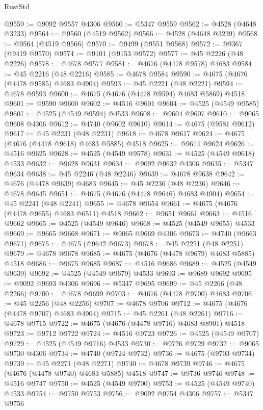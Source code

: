 \begin{lexlean}{RustStd}
\begin{coremodule}
{\begin{coremodule}
{{{{{{{{{{{{{{{{{{{{{{{{{{{{{{{{{{{{{{{{{{{{{{{{{{{{{{{{{{{{@9559 := @9092 @9557 @4306
@9560 := @5347 @9559
@9562 := @4528 (@4648 @3233)
@9564 := @9560 (@4519 @9562)
@9566 := @4528 (@4648 @3239)
@9568 := @9564 (@4519 @9566)
@9570 := @9499 (@9551 @9568)
@9572 := @9367 (@9419 @9570)
@9574 := @9101 (@9153 @9572)
@9577 := @45 @2226 (@48 @2226)
@9578 := @4678 @9577
@9581 := @4676 (@4478 @9578) @4683
@9584 := @45 @2216 (@48 @2216)
@9585 := @4678 @9584
@9590 := @4675 (@4676 (@4478 @9585) @4683 @4904)
@9593 := @45 @2221 (@48 @2221)
@9594 := @4678 @9593
@9600 := @4675 (@4676 (@4478 @9594) @4683 @5869) @4518
@9601 := @9590 @9600
@9602 := @4516 @9601
@9604 := @4525 (@4549 @9585)
@9607 := @4525 (@4549 @9594) @4533
@9608 := @9604 @9607
@9610 := @9065 @9608 @4306
@9612 := @4740 (@9602 @9610)
@9614 := @4675 (@9581 @9612)
@9617 := @45 @2231 (@48 @2231)
@9618 := @4678 @9617
@9624 := @4675 (@4676 (@4478 @9618) @4683 @5885) @4518
@9625 := @9614 @9624
@9626 := @4516 @9625
@9628 := @4525 (@4549 @9578)
@9631 := @4525 (@4549 @9618) @4533
@9632 := @9628 @9631
@9634 := @9092 @9632 @4306
@9635 := @5347 @9634
@9638 := @45 @2246 (@48 @2246)
@9639 := @4678 @9638
@9642 := @4676 (@4478 @9639) @4683
@9645 := @45 @2236 (@48 @2236)
@9646 := @4678 @9645
@9651 := @4675 (@4676 (@4478 @9646) @4683 @4904)
@9654 := @45 @2241 (@48 @2241)
@9655 := @4678 @9654
@9661 := @4675 (@4676 (@4478 @9655) @4683 @6511) @4518
@9662 := @9651 @9661
@9663 := @4516 @9662
@9665 := @4525 (@4549 @9646)
@9668 := @4525 (@4549 @9655) @4533
@9669 := @9665 @9668
@9671 := @9065 @9669 @4306
@9673 := @4740 (@9663 @9671)
@9675 := @4675 (@9642 @9673)
@9678 := @45 @2251 (@48 @2251)
@9679 := @4678 @9678
@9685 := @4675 (@4676 (@4478 @9679) @4683 @5885) @4518
@9686 := @9675 @9685
@9687 := @4516 @9686
@9689 := @4525 (@4549 @9639)
@9692 := @4525 (@4549 @9679) @4533
@9693 := @9689 @9692
@9695 := @9092 @9693 @4306
@9696 := @5347 @9695
@9699 := @45 @2266 (@48 @2266)
@9700 := @4678 @9699
@9703 := @4676 (@4478 @9700) @4683
@9706 := @45 @2256 (@48 @2256)
@9707 := @4678 @9706
@9712 := @4675 (@4676 (@4478 @9707) @4683 @4904)
@9715 := @45 @2261 (@48 @2261)
@9716 := @4678 @9715
@9722 := @4675 (@4676 (@4478 @9716) @4683 @8901) @4518
@9723 := @9712 @9722
@9724 := @4516 @9723
@9726 := @4525 (@4549 @9707)
@9729 := @4525 (@4549 @9716) @4533
@9730 := @9726 @9729
@9732 := @9065 @9730 @4306
@9734 := @4740 (@9724 @9732)
@9736 := @4675 (@9703 @9734)
@9739 := @45 @2271 (@48 @2271)
@9740 := @4678 @9739
@9746 := @4675 (@4676 (@4478 @9740) @4683 @5885) @4518
@9747 := @9736 @9746
@9748 := @4516 @9747
@9750 := @4525 (@4549 @9700)
@9753 := @4525 (@4549 @9740) @4533
@9754 := @9750 @9753
@9756 := @9092 @9754 @4306
@9757 := @5347 @9756
}}}}}}}}}}}}}}}}}}}}}}}}}}}}}}}}}}}}}}}}}}}}}}}}}}}}}}}}}}}}
\end{coremodule}}
\end{coremodule}
\end{lexlean}
